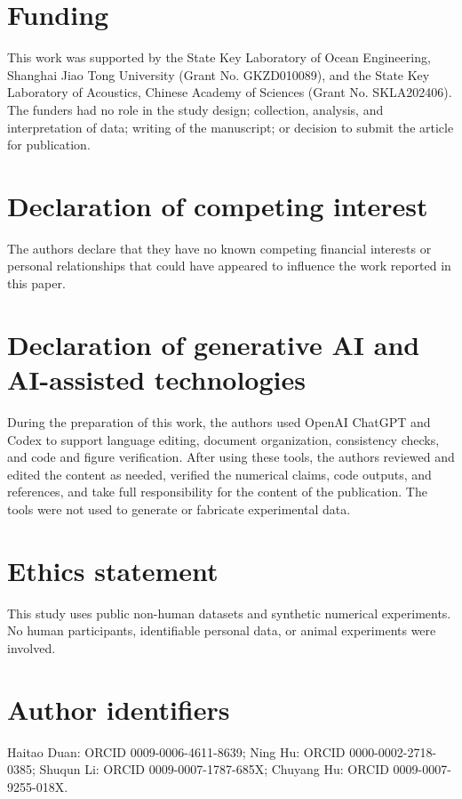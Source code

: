 \documentclass[11pt]{article}
\begin{document}
\section*{Funding}
This work was supported by the State Key Laboratory of Ocean Engineering, Shanghai Jiao Tong University (Grant No. GKZD010089), and the State Key Laboratory of Acoustics, Chinese Academy of Sciences (Grant No. SKLA202406). The funders had no role in the study design; collection, analysis, and interpretation of data; writing of the manuscript; or decision to submit the article for publication.

\section*{Declaration of competing interest}
The authors declare that they have no known competing financial interests or personal relationships that could have appeared to influence the work reported in this paper.

\section*{Declaration of generative AI and AI-assisted technologies}
During the preparation of this work, the authors used OpenAI ChatGPT and Codex to support language editing, document organization, consistency checks, and code and figure verification. After using these tools, the authors reviewed and edited the content as needed, verified the numerical claims, code outputs, and references, and take full responsibility for the content of the publication. The tools were not used to generate or fabricate experimental data.

\section*{Ethics statement}
This study uses public non-human datasets and synthetic numerical experiments. No human participants, identifiable personal data, or animal experiments were involved.

\section*{Author identifiers}
Haitao Duan: ORCID 0009-0006-4611-8639; Ning Hu: ORCID 0000-0002-2718-0385; Shuqun Li: ORCID 0009-0007-1787-685X; Chuyang Hu: ORCID 0009-0007-9255-018X.



\end{document}
